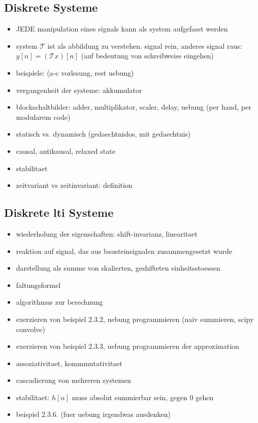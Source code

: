 \subsection{Diskrete Systeme}
\begin{itemize}
    \item JEDE manipulation eines signals kann als system aufgefasst werden
    \item system $\mathcal{T}$ ist als abbildung zu verstehen. signal rein, anderes signal raus: $y[n] = (\mathcal{T}x)[n]$ (auf bedeutung von schreibweise eingehen)
    \item beispiele: \cite[ex. 2.2.1]{proakis2013} (a-c vorlesung, rest uebung)
    \item vergangenheit der systeme: akkumulator
    \item blockschaltbilder: adder, multiplikator, scaler, delay, uebung \cite[ex 2.2.3]{proakis2013}(per hand, per modularem code)
    \item statisch vs. dynamisch (gedaechtnislos, mit gedaechtnis)
    \item causal, antikausal, relaxed state
    \item stabilitaet
    \item zeitvariant vs zeitinvariant: definition
\end{itemize}

\subsection{Diskrete \texorpdfstring{\acrshort{lti}}{LTI} Systeme}\label{disc_lti}

\begin{itemize}
    \item wiederholung der eigenschaften: shift-invarianz, linearitaet
    \item reaktion auf signal, das aus bausteinsignalen zusammengesetzt wurde
    \item darstellung als summe von skalierten, geshifteten einheitsstoessen
    \item faltungsformel
    \item algorithmus zur berechnung
    \item exerzieren von beispiel 2.3.2, uebung programmieren (naiv summieren, scipy convolve)
    \item exerzieren von beispiel 2.3.3, uebung programmieren der approximation
    \item assoziativitaet, kommmutativitaet
    \item cascadierung von mehreren systemen
    \item stabilitaet: $h[n]$ muss absolut summierbar sein, gegen $0$ gehen
    \item beispiel 2.3.6. (fuer uebung irgendwas ausdenken)
\end{itemize}

